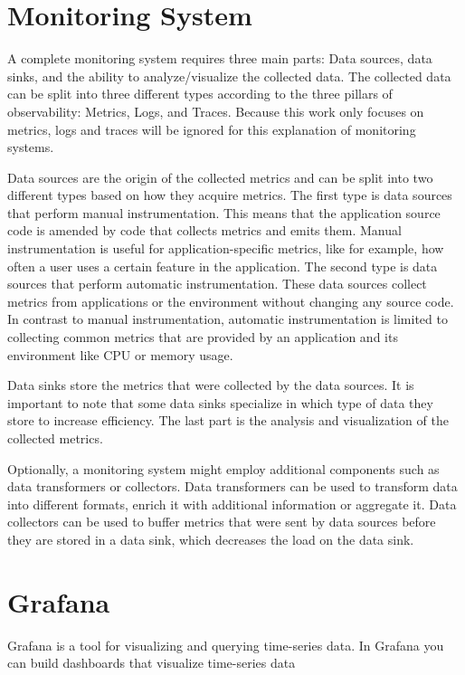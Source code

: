 \section{Monitoring System}
A complete monitoring system requires three main parts: Data sources, data sinks, and the ability
to analyze/visualize the collected data.
The collected data can be split into three different types
according to the three pillars of observability: Metrics, Logs, and Traces.
Because this work only focuses on metrics, logs and traces will be ignored for this explanation of monitoring systems.

Data sources are the origin of the collected metrics and can be split into two different types
based on how they acquire metrics. The first type is data sources that perform manual instrumentation.
This means that the application source code is amended by code that collects metrics and emits them.
Manual instrumentation is useful for application-specific metrics, like for example, how often a user
uses a certain feature in the application.
The second type is data sources that perform automatic instrumentation.
These data sources collect metrics from applications or the environment without changing any source code.
In contrast to manual instrumentation, automatic instrumentation is limited to collecting
common metrics that are provided by an application and its environment like CPU or memory usage.

Data sinks store the metrics that were collected by the data sources.
It is important to note that some data sinks specialize in which type of data they store
to increase efficiency. The last part is the analysis and visualization of the collected metrics.

Optionally, a monitoring system might employ additional components such as data transformers or collectors.
Data transformers can be used to transform data into different formats, enrich it with additional information
or aggregate it.
Data collectors can be used to buffer metrics that were sent by data sources before they are stored in a data sink,
which decreases the load on the data sink.

\section{Grafana}
Grafana is a tool for visualizing and querying time-series data.
In Grafana you can build dashboards that visualize time-series data

